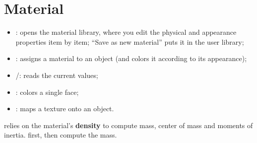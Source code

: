 \section{Material}

\begin{itemize}
  \item {}: opens the material library, where you edit the physical and appearance
        properties item by item; ``Save as new material'' puts it in the user library;
  \item {}: assigns a material to an object (and colors it according to its
        appearance);
  \item {}/: reads the current values;
  \item {}: colors a single face;
  \item {}: maps a texture onto an object.
\end{itemize}

\begin{tip}
 relies on the material's \textbf{density} to compute mass, center of
mass and moments of inertia.  first, then compute the mass.
\end{tip}
